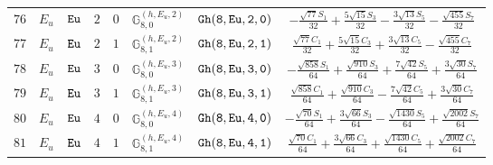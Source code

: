 \documentclass[fleqn,8pt]{jsarticle}
\begin{document}
\begin{table}[ht!]
\begin{center}
\begin{tabular}{cccccccc}
$ 76 $ & $ E_{u} $ & $ {\tt Eu} $ & $ 2 $ & $ 0 $ & $ \mathbb{G}_{8,0}^{(h,E_{u},2)} $ & $ {\tt Gh(8,Eu,2,0)} $ & $ - \frac{\sqrt{77} S_{1}}{32} + \frac{5 \sqrt{15} S_{3}}{32} - \frac{3 \sqrt{13} S_{5}}{32} - \frac{\sqrt{455} S_{7}}{32} $ \\
$ 77 $ & $ E_{u} $ & $ {\tt Eu} $ & $ 2 $ & $ 1 $ & $ \mathbb{G}_{8,1}^{(h,E_{u},2)} $ & $ {\tt Gh(8,Eu,2,1)} $ & $ \frac{\sqrt{77} C_{1}}{32} + \frac{5 \sqrt{15} C_{3}}{32} + \frac{3 \sqrt{13} C_{5}}{32} - \frac{\sqrt{455} C_{7}}{32} $ \\
$ 78 $ & $ E_{u} $ & $ {\tt Eu} $ & $ 3 $ & $ 0 $ & $ \mathbb{G}_{8,0}^{(h,E_{u},3)} $ & $ {\tt Gh(8,Eu,3,0)} $ & $ - \frac{\sqrt{858} S_{1}}{64} + \frac{\sqrt{910} S_{3}}{64} + \frac{7 \sqrt{42} S_{5}}{64} + \frac{3 \sqrt{30} S_{7}}{64} $ \\
$ 79 $ & $ E_{u} $ & $ {\tt Eu} $ & $ 3 $ & $ 1 $ & $ \mathbb{G}_{8,1}^{(h,E_{u},3)} $ & $ {\tt Gh(8,Eu,3,1)} $ & $ \frac{\sqrt{858} C_{1}}{64} + \frac{\sqrt{910} C_{3}}{64} - \frac{7 \sqrt{42} C_{5}}{64} + \frac{3 \sqrt{30} C_{7}}{64} $ \\
$ 80 $ & $ E_{u} $ & $ {\tt Eu} $ & $ 4 $ & $ 0 $ & $ \mathbb{G}_{8,0}^{(h,E_{u},4)} $ & $ {\tt Gh(8,Eu,4,0)} $ & $ - \frac{\sqrt{70} S_{1}}{64} + \frac{3 \sqrt{66} S_{3}}{64} - \frac{\sqrt{1430} S_{5}}{64} + \frac{\sqrt{2002} S_{7}}{64} $ \\
$ 81 $ & $ E_{u} $ & $ {\tt Eu} $ & $ 4 $ & $ 1 $ & $ \mathbb{G}_{8,1}^{(h,E_{u},4)} $ & $ {\tt Gh(8,Eu,4,1)} $ & $ \frac{\sqrt{70} C_{1}}{64} + \frac{3 \sqrt{66} C_{3}}{64} + \frac{\sqrt{1430} C_{5}}{64} + \frac{\sqrt{2002} C_{7}}{64} $ \\
 \hline \hline
\end{tabular}
\end{center}
\end{table}
\end{document}
